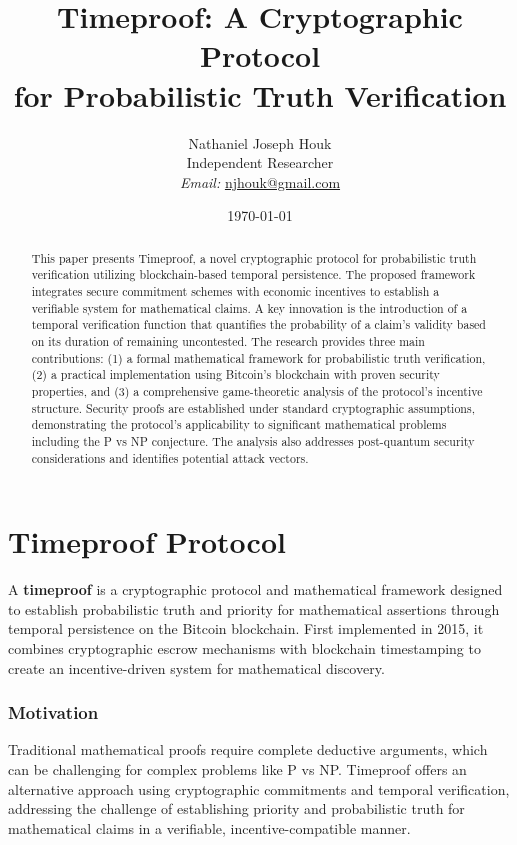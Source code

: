 \documentclass[12pt]{report}
\date{\today}
\begin{document}
\title{Timeproof: A Cryptographic Protocol \\ for Probabilistic Truth Verification}

\author{Nathaniel Joseph Houk\\
Independent Researcher\\
\textit{Email:} \href{mailto:njhouk@gmail.com}{njhouk@gmail.com}}

\maketitle

\begin{abstract}
This paper presents Timeproof, a novel cryptographic protocol for probabilistic truth verification utilizing blockchain-based temporal persistence. The proposed framework integrates secure commitment schemes with economic incentives to establish a verifiable system for mathematical claims. A key innovation is the introduction of a temporal verification function that quantifies the probability of a claim's validity based on its duration of remaining uncontested. The research provides three main contributions: (1) a formal mathematical framework for probabilistic truth verification, (2) a practical implementation using Bitcoin's blockchain with proven security properties, and (3) a comprehensive game-theoretic analysis of the protocol's incentive structure. Security proofs are established under standard cryptographic assumptions, demonstrating the protocol's applicability to significant mathematical problems including the P vs NP conjecture. The analysis also addresses post-quantum security considerations and identifies potential attack vectors.
\end{abstract}

\chapter{Timeproof Protocol}

A \textbf{timeproof} is a cryptographic protocol and mathematical framework designed to establish probabilistic truth and priority for mathematical assertions through temporal persistence on the Bitcoin blockchain. First implemented in 2015, it combines cryptographic escrow mechanisms with blockchain timestamping to create an incentive-driven system for mathematical discovery.

\subsection{Motivation}
Traditional mathematical proofs require complete deductive arguments, which can be challenging for complex problems like P vs NP. Timeproof offers an alternative approach using cryptographic commitments and temporal verification, addressing the challenge of establishing priority and probabilistic truth for mathematical claims in a verifiable, incentive-compatible manner.
\end{document}
